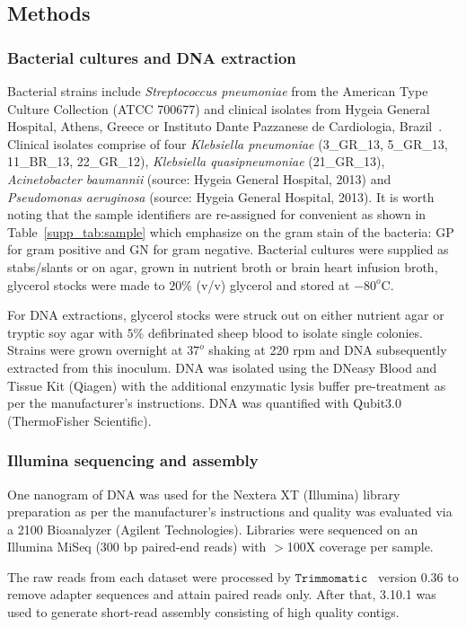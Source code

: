 \subsection{Methods}
\subsubsection{Bacterial cultures and DNA extraction}
Bacterial strains include \emph{Streptococcus pneumoniae} from the American Type Culture Collection (ATCC 700677) and clinical isolates from Hygeia General Hospital, Athens, Greece or Instituto Dante Pazzanese de Cardiologia, Brazil~\cite{Miranda2018}. Clinical isolates comprise of four \emph{Klebsiella pneumoniae} (3\_GR\_13, 5\_GR\_13, 11\_BR\_13, 22\_GR\_12), \emph{Klebsiella quasipneumoniae} (21\_GR\_13), \emph{Acinetobacter baumannii} (source: Hygeia General Hospital, 2013) and \emph{Pseudomonas aeruginosa} (source: Hygeia General Hospital, 2013). It is worth noting that the sample identifiers are re-assigned for convenient as shown in Table~\ref{supp_tab:sample} which emphasize on the gram stain of the bacteria: GP for gram positive and GN for gram negative.
Bacterial cultures were supplied as stabs/slants or on agar, grown in nutrient broth or brain heart infusion broth, glycerol stocks were made to $20 \%$ (v/v) glycerol and stored at $−80^o$C.

For DNA extractions, glycerol stocks were struck out on either nutrient agar or tryptic soy agar with $5\%$ defibrinated sheep blood to isolate single colonies. Strains were grown overnight at $37^o$ shaking at 220 rpm and DNA subsequently extracted from this inoculum. DNA was isolated using the DNeasy Blood and Tissue Kit (Qiagen) with the additional enzymatic lysis buffer pre-treatment as per the manufacturer’s instructions. DNA was quantified with Qubit3.0 (ThermoFisher Scientific).
\subsubsection{Illumina sequencing and assembly}
One nanogram of DNA was used for the Nextera XT (Illumina) library preparation as per the manufacturer’s instructions and quality was evaluated via a 2100 Bioanalyzer (Agilent Technologies). Libraries were sequenced on an Illumina MiSeq (300 bp paired-end reads) with $>$100X coverage per sample.

The raw reads from each dataset were processed by  $\mathtt{Trimmomatic}$~\cite{BolgerLU2014} version 0.36 to remove adapter sequences and attain paired reads only. After that, \spades{} 3.10.1 was used to generate short-read assembly consisting of high quality contigs.
